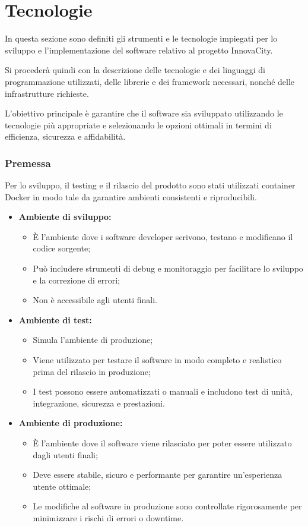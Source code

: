 \section{Tecnologie}
In questa sezione sono definiti gli strumenti e le tecnologie impiegati per lo sviluppo e l'implementazione del software relativo al progetto InnovaCity.

Si procederà quindi con la descrizione delle tecnologie e dei linguaggi di programmazione utilizzati, delle librerie e dei framework necessari, nonché delle infrastrutture richieste.

L'obiettivo principale è garantire che il software sia sviluppato utilizzando le tecnologie più appropriate e selezionando le opzioni ottimali in termini di efficienza, sicurezza e affidabilità.

\subsubsection*{Premessa}
Per lo sviluppo, il testing e il rilascio del prodotto sono stati utilizzati container Docker in modo tale da garantire ambienti consistenti e riproducibili.
\begin{itemize}
  \item \textbf{Ambiente di sviluppo:}
    \begin{itemize}
      \item È l'ambiente dove i software developer scrivono, testano e modificano il codice sorgente;
      \item Può includere strumenti di debug e monitoraggio per facilitare lo sviluppo e la correzione di errori;
      \item Non è accessibile agli utenti finali.
    \end{itemize}
    \item \textbf{Ambiente di test:}
    \begin{itemize}
      \item Simula l'ambiente di produzione;
      \item Viene utilizzato per testare il software in modo completo e realistico prima del rilascio in produzione;
      \item I test possono essere automatizzati o manuali e includono test di unità, integrazione, sicurezza e prestazioni.
    \end{itemize}
    \item \textbf{Ambiente di produzione:}
    \begin{itemize}
      \item È l'ambiente dove il software viene rilasciato per poter essere utilizzato dagli utenti finali;
      \item Deve essere stabile, sicuro e performante per garantire un'esperienza utente ottimale;
      \item Le modifiche al software in produzione sono controllate rigorosamente per minimizzare i rischi di errori o downtime.
    \end{itemize}
\end{itemize}



